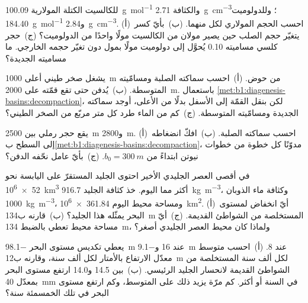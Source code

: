 \begin{exercise}[$\star$]\label{exo:b1:diagenesis-basins:4}
للكالسيت الكتلة المولارية \qty{100.09}{g.mol^{-1}} والكثافة \qty{2.71}{g.cm^{-3}}؛ وللدولوميت \qty{184.40}{g.mol^{-1}} و\qty{2.84}{g.cm^{-3}}. (أ)~احسب الحجم المولاري لكل منهما. (ب)~بأيّ كسر يتغيّر حجم الصلب حين يصير مولان من الكالسيت مولًا واحدًا من الدولوميت؟ (ج)~حجر كلسي مساميته \num{0.10} يُحوَّل إلى دولوميت مولًا بمول دون تغيّر حجمه الخارجي. ما مساميته الجديدة؟
\end{exercise}

\begin{exercise}[$\star\star$]\label{exo:b1:diagenesis-basins:5}
يشغل صخر طيني أعلى \qty{1000}{m} من حوض. (أ)~احسب سماكته الصلبة ومسامّيته المتوسطة. (ب)~يُدفن حتى تقع قمّته على \qty{2000}{m}. باستعمال \cref{met:b1:diagenesis-basins:decompaction}، لكن بنقل القمّة إلى الأسفل بدلًا من الأعلى، أوجد سماكته الجديدة ومسامّيته المتوسطة. (ج)~كم من الماء طرد كل متر مربّع من الصخر الطيني؟
\end{exercise}

\begin{exercise}[$\star\star$]\label{exo:b1:diagenesis-basins:6}
يقع حجر رملي بين \qty{2500}{m} و\qty{2800}{m}. (أ)~احسب سماكته الصلبة. (ب)~افكّ انضغاطه إلى السطح ب\cref{met:b1:diagenesis-basins:decompaction}، مدوّنًا كل خطوة من خطوات نيوتن ابتداءً من $b_0 = \qty{300}{m}$. (ج)~بأيّ عامل نحّفه الدفن؟
\end{exercise}

\begin{exercise}[$\star\star$]\label{exo:b1:diagenesis-basins:7}
في أقصى العصر الجليدي الأخير احتوى الجليد المستقرّ على اليابسة نحو \qty{52e6}{km^3} أكثر مما اليوم. خذ كثافة الجليد \qty{916.7}{kg.m^{-3}}، وكثافة ماء الذوبان \qty{1000}{kg.m^{-3}}، ومساحة محيط اليوم \qty{361.84e6}{km^2}. (أ)~أيّ انخفاض لمستوى البحر يمثّله هذا الجليد؟ (ب)~قارنه ب\qty{134}{m} المستخلصة من الشواطئ القديمة. (ج)~أيّ مساحة محيط تعطي بالضبط \qty{134}{m}، ولماذا كان محيط العصر الجليدي أصغر؟
\end{exercise}

\begin{exercise}[$\star\star$]\label{exo:b1:diagenesis-basins:8}
يعطي تكديس مستوى البحر \qty{-98.1}{m} عند \qty{16}{\ka} و\qty{-9.1}{m} عند \qty{8}{\ka}. (أ)~احسب متوسط معدّل الارتفاع بالأمتار لكل ألف سنة، وقارنه ب\qty{12}{m} لكل ألف سنة المستخلصة من الشواطئ القديمة لانحسار الجليد الرئيسي. (ب)~بين \qty{14.5}{\ka} و\qty{14.0}{\ka} ارتفع مستوى البحر بمعدّل \qty{40}{mm} في السنة أو أكثر. كم مرّة يزيد ذلك على المتوسط، وكم ارتفع مستوى البحر في تلك الخمسمئة سنة؟
\end{exercise}

